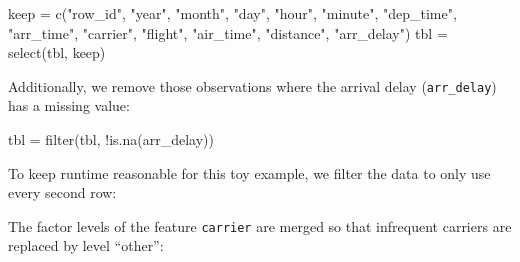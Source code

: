 \documentclass[
  11pt,
  parskip=half,
  DIV=calc,
  BCOR=10mm,
  x11names]{scrbook}
\newenvironment{Shaded}{}{}
\newcommand{\DataTypeTok}[1]{#1}
\newcommand{\DecValTok}[1]{#1}
\newcommand{\KeywordTok}[1]{\textcolor[rgb]{0.00,0.00,1.00}{#1}}
\newcommand{\NormalTok}[1]{#1}
\newcommand{\OperatorTok}[1]{#1}
\newcommand{\OtherTok}[1]{\textcolor[rgb]{1.00,0.25,0.00}{#1}}
\newcommand{\StringTok}[1]{\textcolor[rgb]{0.00,0.50,0.50}{#1}}
\begin{document}
\begin{Shaded}
\begin{Highlighting}[]
\NormalTok{keep =}\StringTok{ }\KeywordTok{c}\NormalTok{(}\StringTok{"row_id"}\NormalTok{, }\StringTok{"year"}\NormalTok{, }\StringTok{"month"}\NormalTok{, }\StringTok{"day"}\NormalTok{, }\StringTok{"hour"}\NormalTok{, }\StringTok{"minute"}\NormalTok{, }
  \StringTok{"dep_time"}\NormalTok{, }\StringTok{"arr_time"}\NormalTok{, }\StringTok{"carrier"}\NormalTok{, }\StringTok{"flight"}\NormalTok{, }\StringTok{"air_time"}\NormalTok{, }
  \StringTok{"distance"}\NormalTok{, }\StringTok{"arr_delay"}\NormalTok{)}
\NormalTok{tbl =}\StringTok{ }\KeywordTok{select}\NormalTok{(tbl, keep)}
\end{Highlighting}
\end{Shaded}

Additionally, we remove those observations where the arrival delay (\texttt{arr\_delay}) has a missing value:

\begin{Shaded}
\begin{Highlighting}[]
\NormalTok{tbl =}\StringTok{ }\KeywordTok{filter}\NormalTok{(tbl, }\OperatorTok{!}\KeywordTok{is.na}\NormalTok{(arr_delay))}
\end{Highlighting}
\end{Shaded}

To keep runtime reasonable for this toy example, we filter the data to only use every second row:

\begin{Shaded}
\end{Shaded}

The factor levels of the feature \texttt{carrier} are merged so that infrequent carriers are replaced by level ``other'':

\begin{Shaded}
\end{Shaded}
\end{document}
